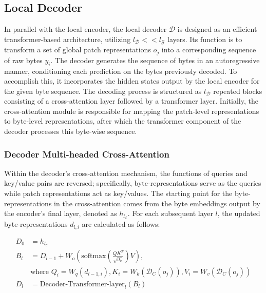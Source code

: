 \subsection{Local Decoder} 

In parallel with the local encoder, the local decoder $\mathcal{D}$ is designed as an efficient transformer-based architecture, utilizing $l_{\mathcal{D}} << l_{\mathcal{G}}$ layers. Its function is to transform a set of global patch representations $o_j$ into a corresponding sequence of raw bytes $y_i$. The decoder generates the sequence of bytes in an autoregressive manner, conditioning each prediction on the bytes previously decoded. To accomplish this, it incorporates the hidden states output by the local encoder for the given byte sequence. The decoding process is structured as $l_{\mathcal{D}}$ repeated blocks consisting of a cross-attention layer followed by a transformer layer. Initially, the cross-attention module is responsible for mapping the patch-level representations to byte-level representations, after which the transformer component of the decoder processes this byte-wise sequence.

\subsubsection{Decoder Multi-headed Cross-Attention} 

Within the decoder's cross-attention mechanism, the functions of queries and key/value pairs are reversed; specifically, byte-representations serve as the queries while patch representations act as key/values. The starting point for the byte-representations in the cross-attention comes from the byte embeddings output by the encoder’s final layer, denoted as $h_{l_{\mathcal{E}}}$. For each subsequent layer $l$, the updated byte-representations $d_{l,i}$ are calculated as follows:

\begin{align}
D_0 &= h_{l_{\mathcal{E}}} \\
B_l &= D_{l-1} + W_o\left(\text{softmax}\left(\frac{QK^T}{\sqrt{d_k}}\right)V\right), \\
  &\text{where } Q_i = W_q(d_{l-1,i}), K_i = W_k(\mathcal{D}_C(o_j)), V_i = W_v(\mathcal{D}_C(o_j)) \\
  D_l &= \text{Decoder-Transformer-layer}_l(B_l)
\end{align}

